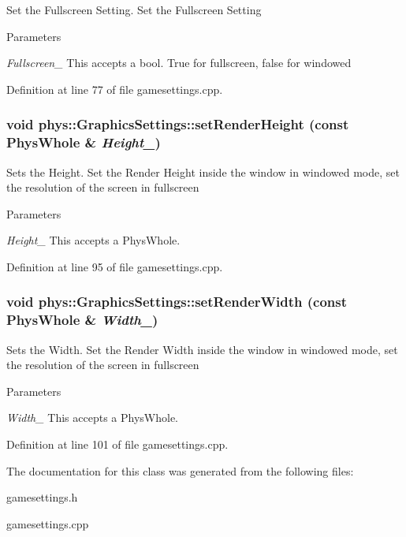 Set the Fullscreen Setting. Set the Fullscreen Setting 
\begin{DoxyParams}{Parameters}
\item[{\em Fullscreen\_\-}]This accepts a bool. True for fullscreen, false for windowed \end{DoxyParams}


Definition at line 77 of file gamesettings.cpp.\hypertarget{classphys_1_1GraphicsSettings_ace1f9f0f9c29a0c82524ce0bcffd16fa}{
\subsubsection[{setRenderHeight}]{\setlength{\rightskip}{0pt plus 5cm}void phys::GraphicsSettings::setRenderHeight (const PhysWhole \& {\em Height\_\-})}}
\label{dc/df1/classphys_1_1GraphicsSettings_ace1f9f0f9c29a0c82524ce0bcffd16fa}


Sets the Height. Set the Render Height inside the window in windowed mode, set the resolution of the screen in fullscreen 
\begin{DoxyParams}{Parameters}
\item[{\em Height\_\-}]This accepts a PhysWhole. \end{DoxyParams}


Definition at line 95 of file gamesettings.cpp.\hypertarget{classphys_1_1GraphicsSettings_a4d74a7f2f880a5d556f43bcdbedc5e27}{
\subsubsection[{setRenderWidth}]{\setlength{\rightskip}{0pt plus 5cm}void phys::GraphicsSettings::setRenderWidth (const PhysWhole \& {\em Width\_\-})}}
\label{dc/df1/classphys_1_1GraphicsSettings_a4d74a7f2f880a5d556f43bcdbedc5e27}


Sets the Width. Set the Render Width inside the window in windowed mode, set the resolution of the screen in fullscreen 
\begin{DoxyParams}{Parameters}
\item[{\em Width\_\-}]This accepts a PhysWhole. \end{DoxyParams}


Definition at line 101 of file gamesettings.cpp.

The documentation for this class was generated from the following files:\begin{DoxyCompactItemize}
\item 
gamesettings.h\item 
gamesettings.cpp\end{DoxyCompactItemize}
